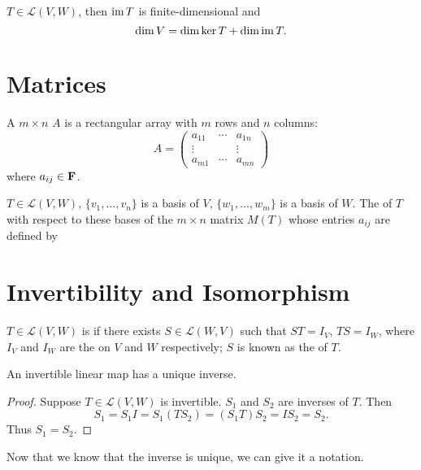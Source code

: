 \begin{theorem}
$T\in\mathcal{L}(V,W)$, then $\operatorname{im} T$ is finite-dimensional and
\[\dim V=\dim\ker T+\dim\operatorname{im} T.\]
\end{theorem}

\section{Matrices}
\begin{definition}[Matrix]
A $m\times n$  $A$ is a rectangular array with $m$ rows and $n$ columns:
\[A=\begin{pmatrix}
a_{11} & \cdots & a_{1n}\\
\vdots & & \vdots\\
a_{m1} & \cdots & a_{mn}
\end{pmatrix}\]
where $a_{ij}\in\mathbf F$.
\end{definition}

\begin{definition}
$T\in\mathcal{L}(V,W)$, $\{v_1,\dots,v_n\}$ is a basis of $V$, $\{w_1,\dots,w_m\}$ is a basis of $W$. The  of $T$ with respect to these bases of the $m\times n$ matrix $M(T)$ whose entries $a_{ij}$ are defined by

\end{definition}

\section{Invertibility and Isomorphism}
\begin{definition}[Invertibility]
$T\in\mathcal{L}(V,W)$ is  if there exists $S\in\mathcal{L}(W,V)$ such that $ST=I_V$, $TS=I_W$, where $I_V$ and $I_W$ are the  on $V$ and $W$ respectively; $S$ is known as the  of $T$.
\end{definition}

\begin{proposition}
An invertible linear map has a unique inverse.
\end{proposition}

\begin{proof}
Suppose $T\in\mathcal{L}(V,W)$ is invertible. $S_1$ and $S_2$ are inverses of $T$. Then
\[S_1=S_1I=S_1(TS_2)=(S_1T)S_2=IS_2=S_2.\]
Thus $S_1=S_2$.
\end{proof}

Now that we know that the inverse is unique, we can give it a notation.

